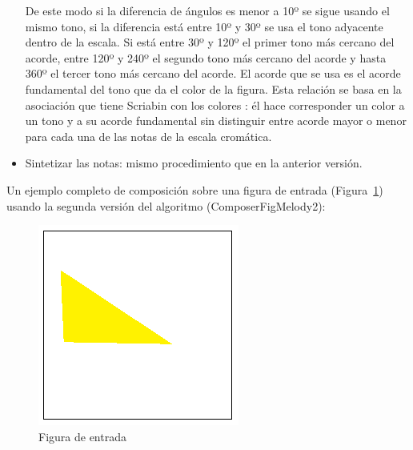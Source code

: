 \begin{itemize}
De este modo si la diferencia de ángulos es menor a 10º se sigue usando el mismo tono, si la diferencia está entre 10º y 30º se usa el tono adyacente dentro de la escala. Si está entre 30º y 120º el primer tono más cercano del acorde, entre 120º y 240º el segundo tono más cercano del acorde y hasta 360º el tercer tono más cercano del acorde. El acorde que se usa es el acorde fundamental del tono que da el color de la figura. Esta relación se basa en la asociación que tiene Scriabin con los colores \cite{ScriabinQuintasColor}: él hace corresponder un color a un tono y a su acorde fundamental sin distinguir entre acorde mayor o menor para cada una de las notas de la escala cromática.

	\item Sintetizar las notas: mismo procedimiento que en la anterior versión.

\end{itemize}

Un ejemplo completo de composición sobre una figura de entrada (Figura~\ref{fig:Figura0Voz1}) usando la segunda versión del algoritmo (ComposerFigMelody2): \\

		\begin{figure}[!htbp]
		\centering
		\hspace*{0.0in}
		\includegraphics[scale=1.0]{graphics/simpletest1.png}
		\caption{Figura de entrada}
		\label{fig:Figura0Voz1}
		\end{figure}


